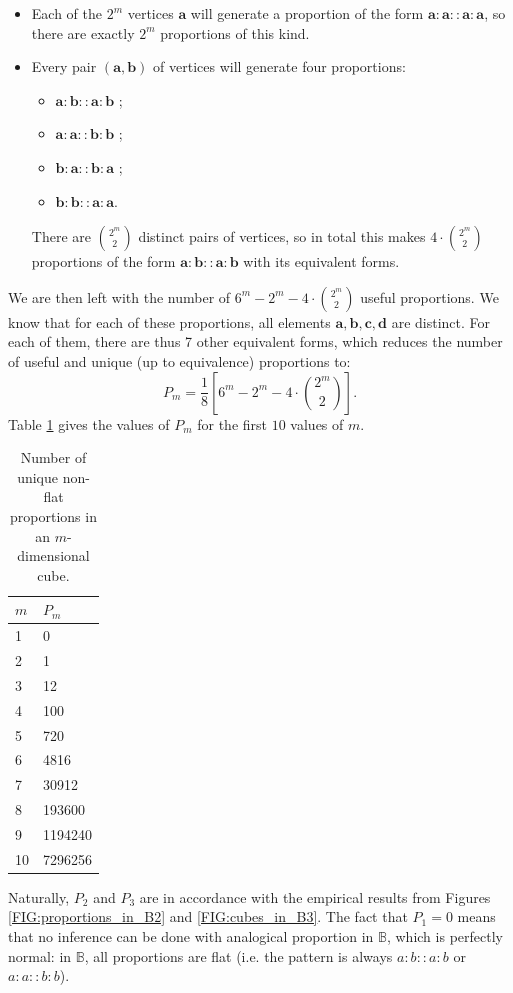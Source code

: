 \begin{itemize}
  \item Each of the $2^m$ vertices $\mathbf{a}$ will generate a proportion of the
    form $\mathbf{a}: \mathbf{a} :: \mathbf{a} : \mathbf{a}$, so there are
    exactly $2^m$ proportions of this kind.
  \item Every pair $(\mathbf{a}, \mathbf{b})$ of vertices will generate four
    proportions:
    \begin{itemize}
      \item $\mathbf{a}: \mathbf{b} :: \mathbf{a} : \mathbf{b}$ ;
      \item $\mathbf{a}: \mathbf{a} :: \mathbf{b} : \mathbf{b}$ ;
      \item $\mathbf{b}: \mathbf{a} :: \mathbf{b} : \mathbf{a}$ ;
      \item $\mathbf{b}: \mathbf{b} :: \mathbf{a} : \mathbf{a}$.
    \end{itemize}
    There are $\binom{2^m}{2}$ distinct pairs of vertices, so in total this
    makes $4\cdot \binom{2^m}{2}$ proportions of the form $\mathbf{a}: \mathbf{b} ::
    \mathbf{a} : \mathbf{b}$ with its equivalent forms.
\end{itemize}

We are then left with the number of $6^m - 2^m - 4\cdot\binom{2^m}{2}$ useful
proportions. We know that for each of these proportions, all elements
$\mathbf{a}, \mathbf{b}, \mathbf{c}, \mathbf{d}$  are distinct. For each of
them, there are thus 7 other equivalent forms, which reduces the number of
useful and unique (up to equivalence) proportions to:
$$P_m = \frac{1}{8} \left[6^m - 2^m - 4\cdot\binom{2^m}{2} \right].$$
Table \ref{TAB:n_params_in_cube} gives the values of $P_m$ for the first $10$
values of $m$.
\begin{table}[h!]
\centering
  \begin{tabular}{ l  l }
\toprule
 $m$ & $P_m$\\
\midrule
    1	&	0\\
    2 &	1\\
    3	&	12\\
    4	&	100\\
    5 &	720\\
    6 &	4816\\
    7 &	30912\\
    8 &	193600\\
    9 & 1194240\\
    10 & 7296256\\
\bottomrule
\end{tabular}
\caption{Number of unique non-flat proportions in an $m$-dimensional cube.}
\label{TAB:n_params_in_cube}
\end{table}
Naturally, $P_2$ and $P_3$ are in accordance with the empirical  results from
Figures \ref{FIG:proportions_in_B2} and \ref{FIG:cubes_in_B3}. The fact that
$P_1 = 0$ means that no inference can be done with analogical proportion in
$\mathbb{B}$, which is perfectly normal: in $\mathbb{B}$, all proportions are
flat (i.e. the pattern is always $a:b::a:b$ or $a:a::b:b$).

